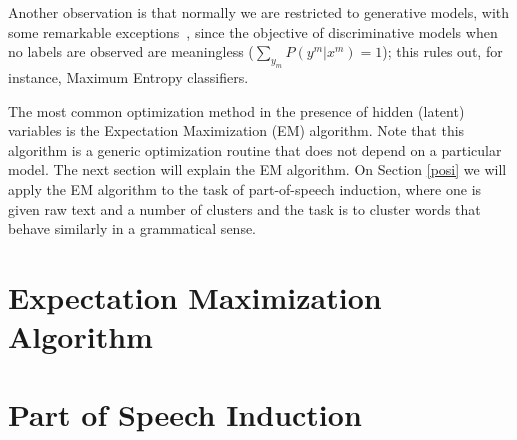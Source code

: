 Another observation is that normally we are restricted to generative models, 
with some remarkable exceptions~\citep{smith2005acl}, since the objective of discriminative models when no labels are observed are 
meaningless ($\sum_{y_m } P(y^m |x^m) = 1$); this rules out, for instance, Maximum Entropy classifiers.  

The most common optimization method in the presence of hidden (latent) variables is the Expectation Maximization (EM) algorithm. Note that this algorithm is a generic optimization routine that does not depend on a particular model. The next section will explain the EM algorithm. On Section \ref{posi} we will apply the EM algorithm to the task of part-of-speech induction, where one is given raw text and a number of clusters and the task is to cluster words that behave similarly in a grammatical sense. 

\section{\label{em}Expectation Maximization Algorithm}


\section{\label{posi}Part of Speech Induction}




